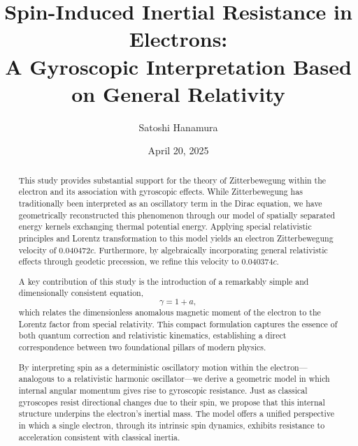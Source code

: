 \documentclass[%
 reprint,
 amsmath,amssymb,
 aps,
]{revtex4-1}
\numberwithin{equation}{section}%
\begin{document}


\title{Spin-Induced Inertial Resistance in Electrons:\\A Gyroscopic Interpretation Based on General Relativity}

\author{Satoshi Hanamura}
\date{April 20, 2025}

\begin{abstract}
This study provides substantial support for the theory of Zitterbewegung within the electron and its association with gyroscopic effects. While Zitterbewegung has traditionally been interpreted as an oscillatory term in the Dirac equation, we have geometrically reconstructed this phenomenon through our model of spatially separated energy kernels exchanging thermal potential energy. Applying special relativistic principles and Lorentz transformation to this model yields an electron Zitterbewegung velocity of 0.040472$c$. Furthermore, by algebraically incorporating general relativistic effects through geodetic precession, we refine this velocity to 0.040374$c$.

A key contribution of this study is the introduction of a remarkably simple and dimensionally consistent equation,
\[
\gamma = 1 + a,
\]
which relates the dimensionless anomalous magnetic moment of the electron to the Lorentz factor from special relativity. This compact formulation captures the essence of both quantum correction and relativistic kinematics, establishing a direct correspondence between two foundational pillars of modern physics.

By interpreting spin as a deterministic oscillatory motion within the electron—analogous to a relativistic harmonic oscillator—we derive a geometric model in which internal angular momentum gives rise to gyroscopic resistance. Just as classical gyroscopes resist directional changes due to their spin, we propose that this internal structure underpins the electron’s inertial mass. The model offers a unified perspective in which a single electron, through its intrinsic spin dynamics, exhibits resistance to acceleration consistent with classical inertia.
\end{abstract}

\maketitle
\end{document}
